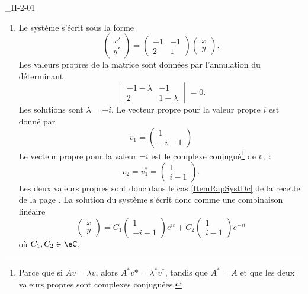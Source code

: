

\begin{corrige}{_II-2-01}

\begin{enumerate}
\item 

Le système s'écrit sous la forme
\begin{equation}
	\begin{pmatrix}
	x'	\\ 
	y'	
\end{pmatrix}=
\begin{pmatrix}
	-1	&	-1	\\ 
	2	&	1	
\end{pmatrix}
\begin{pmatrix}
	x	\\ 
	y	
\end{pmatrix}.
\end{equation}
Les valeurs propres de la matrice sont données par l'annulation du déterminant
\begin{equation}
	\begin{vmatrix}
	-1-\lambda	&	-1	\\ 
	2	&	1-\lambda	
\end{vmatrix}=0.
\end{equation}
Les solutions sont $\lambda=\pm i$. Le vecteur propre pour la valeur propre $i$ est donné par
\begin{equation}
	v_1=\begin{pmatrix}
	1	\\ 
	-i-1	
\end{pmatrix}
\end{equation}
Le vecteur propre pour la valeur $-i$ est le complexe conjugué\footnote{Parce que si $Av=\lambda v$, alors $A^*v*=\lambda^*v^*$, tandis que $A^*=A$ et que les deux valeurs propres sont complexes conjuguées.} de $v_1$ :
\begin{equation}
	v_2=v_1^*=
\begin{pmatrix}
	1	\\ 
	i-1	
\end{pmatrix}.
\end{equation}
Les deux valeurs propres sont donc dans le cas \ref{ItemRapSystDc} de la recette de la page \pageref{ItemRapSystDc}. La solution du système s'écrit donc comme une combinaison linéaire
\begin{equation}
	\begin{pmatrix}
	x	\\ 
	y	
\end{pmatrix}=
C_1\begin{pmatrix}
	1	\\ 
	-i-1	
\end{pmatrix} e^{it}+
C_2\begin{pmatrix}
	1	\\ 
	i-1	
\end{pmatrix} e^{-it}
\end{equation}
où $C_1,C_2\in\eC$.


\end{enumerate}
\end{corrige}
